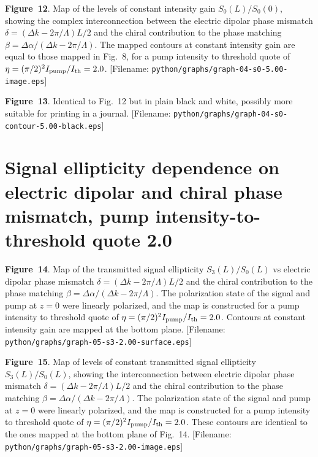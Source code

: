 \centerline{\epsfxsize=240pt}
\medskip
\noindent
{\bf Figure~12}.
Map of the levels of constant intensity gain $S_0(L)/S_0(0)$, showing the
complex interconnection between the electric dipolar phase mismatch
$\delta=(\Delta k-2\pi/\Lambda)L/2$ and the chiral contribution to the phase
matching $\beta=\Delta\alpha/(\Delta k-2\pi/\Lambda)$. The mapped contours
at constant intensity gain are equal to those mapped in Fig.~8, for a pump
intensity to threshold quote of $\eta=(\pi/2)^2I_{\rm pump}/I_{\rm th}=2.0$.
[Filename: {\tt python/graphs/graph-04-s0-5.00-image.eps}]
\bigskip

\centerline{\epsfxsize=240pt}
\medskip
\noindent
{\bf Figure~13}.
Identical to Fig.~12 but in plain black and white, possibly more suitable for
printing in a journal.
[Filename: {\tt python/graphs/graph-04-s0-contour-5.00-black.eps}]
\vfill\eject

\section{Signal ellipticity dependence on electric dipolar and chiral
         phase mismatch, pump intensity-to-threshold quote 2.0}
\bigskip
\bigskip
\centerline{\epsfxsize=240pt}
\medskip
\noindent
{\bf Figure~14}.
Map of the transmitted signal ellipticity $S_3(L)/S_0(L)$ vs electric dipolar phase
mismatch $\delta=(\Delta k-2\pi/\Lambda)L/2$ and the chiral contribution to
the phase matching $\beta=\Delta\alpha/(\Delta k-2\pi/\Lambda)$.
The polarization state of the signal and pump at $z=0$ were linearly polarized,
and the map is constructed for a pump intensity to threshold quote of
$\eta=(\pi/2)^2I_{\rm pump}/I_{\rm th}=2.0$. Contours at constant intensity gain
are mapped at the bottom plane.
[Filename: {\tt python/graphs/graph-05-s3-2.00-surface.eps}]
\bigskip

\centerline{\epsfxsize=240pt}
\medskip
\noindent
{\bf Figure~15}.
Map of levels of constant transmitted signal ellipticity $S_3(L)/S_0(L)$,
showing the interconnection between electric dipolar phase mismatch
$\delta=(\Delta k-2\pi/\Lambda)L/2$ and the chiral contribution to the
phase matching $\beta=\Delta\alpha/(\Delta k-2\pi/\Lambda)$.
The polarization state of the signal and pump at $z=0$ were linearly polarized,
and the map is constructed for a pump intensity to threshold quote of
$\eta=(\pi/2)^2I_{\rm pump}/I_{\rm th}=2.0$.
These contours are identical to the ones mapped at the bottom plane of Fig.~14.
[Filename: {\tt python/graphs/graph-05-s3-2.00-image.eps}]
\vfill\eject

